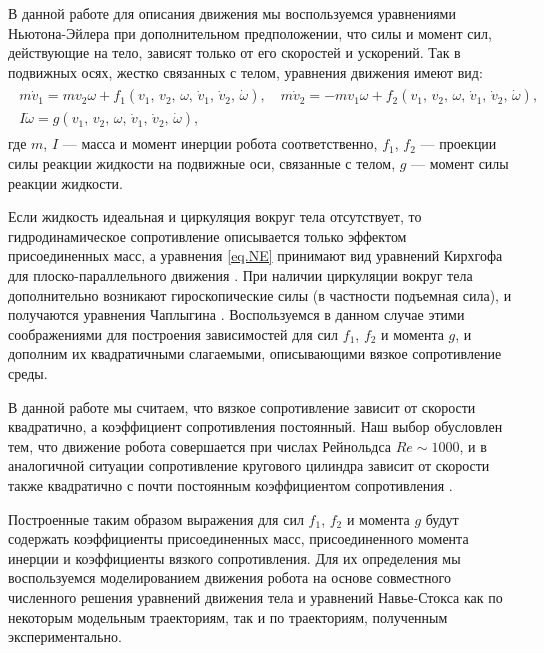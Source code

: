 В данной работе для описания движения мы воспользуемся уравнениями Ньютона-Эйлера при дополнительном предположении, что силы и момент сил, действующие на тело, зависят только от его скоростей и ускорений. Так в подвижных осях, жестко связанных с телом, уравнения движения имеют вид:
\begin{gather}
\begin{gathered}
m \dot{v}_1 = m v_2 \omega + f_1 (v_1,\, v_2,\, \omega,\, \dot{v}_1,\, \dot{v}_2,\, \dot \omega),\quad m \dot{v}_2 = -m v_1 \omega + f_2 (v_1,\, v_2,\, \omega,\, \dot{v}_1,\, \dot{v}_2,\, \dot \omega),\\
I \dot{\omega} = g (v_1,\, v_2,\, \omega,\, \dot{v}_1,\, \dot{v}_2,\, \dot \omega),
\end{gathered}\label{eq.NE}
\end{gather}
где $m$, $I$ --- масса и момент инерции робота соответственно, $f_1$, $f_2$ --- проекции силы реакции жидкости на подвижные оси, связанные с телом, $g$ --- момент силы реакции жидкости. 

Если жидкость идеальная и циркуляция вокруг тела отсутствует, то гидродинамическое сопротивление описывается только эффектом присоединенных масс, а уравнения \eqref{eq.NE} принимают вид уравнений Кирхгофа для плоско-параллельного движения \cite{Kirchhoff_1869}. При наличии циркуляции вокруг тела дополнительно возникают гироскопические силы (в частности подъемная сила), и получаются уравнения Чаплыгина \cite{Borisov_Mamaev_2006, Chaplygin}. Воспользуемся в данном случае этими соображениями для построения зависимостей для сил $f_1$, $f_2$ и момента $g$, и дополним их квадратичными слагаемыми, описывающими вязкое сопротивление среды.

В данной работе мы считаем, что вязкое сопротивление зависит от скорости квадратично, а коэффициент сопротивления постоянный. Наш выбор обусловлен тем, что движение робота совершается при числах Рейнольдса $Re \sim 1000$, и в аналогичной ситуации сопротивление кругового цилиндра зависит от скорости также квадратично с почти постоянным коэффициентом сопротивления \cite{Schlichting}.

Построенные таким образом выражения для сил $f_1$, $f_2$ и момента $g$ будут содержать коэффициенты присоединенных масс, присоединенного момента инерции и коэффициенты вязкого сопротивления. Для их определения мы воспользуемся моделированием движения робота на основе совместного численного решения уравнений движения тела и уравнений Навье-Стокса как по некоторым модельным траекториям, так и по траекториям, полученным экспериментально.

